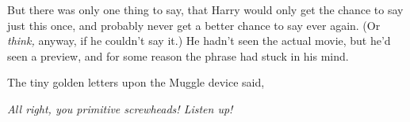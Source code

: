 But there was only one thing to say, that Harry would only get the chance to
say just this once, and probably never get a better chance to say ever again.
(Or \emph{think,} anyway, if he couldn't say it.) He hadn't seen the actual
movie, but he'd seen a preview, and for some reason the phrase had stuck in his
mind.

The tiny golden letters upon the Muggle device said,

\emph{All right, you primitive screwheads! Listen up!}
